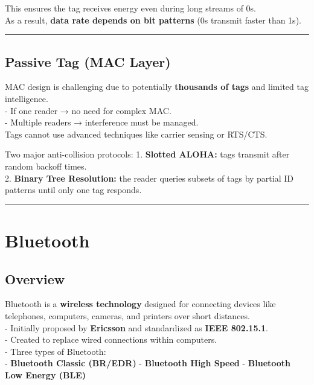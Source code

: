 \documentclass[a4paper, 12pt]{book} %
\begin{document}
This ensures the tag receives energy even during long streams of 0s.\\
As a result, \textbf{data rate depends on bit patterns} (0s transmit
faster than 1s).

\begin{center}\rule{0.5\linewidth}{0.5pt}\end{center}

\subsection{Passive Tag (MAC Layer)}\label{passive-tag-mac-layer}

MAC design is challenging due to potentially \textbf{thousands of tags}
and limited tag intelligence.\\
- If one reader → no need for complex MAC.\\
- Multiple readers → interference must be managed.\\
Tags cannot use advanced techniques like carrier sensing or RTS/CTS.

Two major anti-collision protocols: 1. \textbf{Slotted ALOHA:} tags
transmit after random backoff times.\\
2. \textbf{Binary Tree Resolution:} the reader queries subsets of tags
by partial ID patterns until only one tag responds.

\begin{center}\rule{0.5\linewidth}{0.5pt}\end{center}


\section{Bluetooth}\label{bluetooth}

\subsection{Overview}\label{overview}

Bluetooth is a \textbf{wireless technology} designed for connecting
devices like telephones, computers, cameras, and printers over short
distances.\\
- Initially proposed by \textbf{Ericsson} and standardized as
\textbf{IEEE 802.15.1}.\\
- Created to replace wired connections within computers.\\
- Three types of Bluetooth:\\
- \textbf{Bluetooth Classic (BR/EDR)} - \textbf{Bluetooth High Speed} -
\textbf{Bluetooth Low Energy (BLE)}
\end{document}
